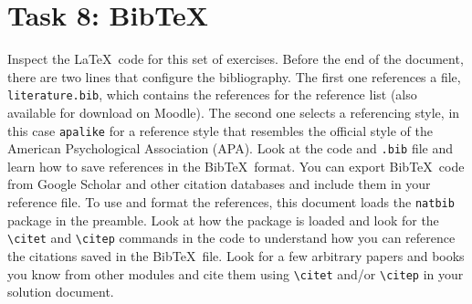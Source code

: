 \documentclass[a4paper,11pt]{article}
\begin{document}
\section*{Task 8: Bib\TeX}
Inspect the \LaTeX\ code for this set of exercises. Before the end of the document, there are two lines that configure the bibliography. The first one references a file, \verb+literature.bib+, which contains the references for the reference list (also available for download on Moodle). The second one selects a referencing style, in this case \verb+apalike+ for a reference style that resembles the official style of the American Psychological Association (APA). Look at the code and \verb+.bib+ file and learn how to save references in the Bib\TeX\ format. You can export Bib\TeX\ code from Google Scholar and other citation databases and include them in your reference file. To use and format the references, this document loads the \verb+natbib+ package in the preamble. Look at how the package is loaded and look for the \verb+\citet+ and \verb+\citep+ commands in the code to understand how you can reference the citations saved in the Bib\TeX\ file. Look for a few arbitrary papers and books you know from other modules and cite them using \verb+\citet+ and/or \verb+\citep+ in your solution document.




\end{document}

